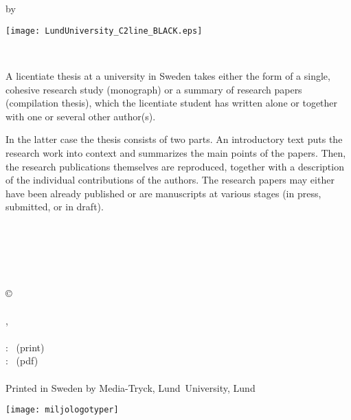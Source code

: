 \cleardoublepage
\thispagestyle{empty} %
~
\vfill
\begin{center}
{\HUGE \myMainTitle}
\\[2mm]
{\huge \mySubTitle}

\vfill
{by \myName}

\vfill
\texttt{[image: LundUniversity\_C2line\_BLACK.eps]}

\\
\end{center}
\vfill


\newpage 
\thispagestyle{empty} %
\vspace{-15mm}
A licentiate thesis at a university in Sweden takes either the form of a single,
cohesive research study (monograph) or a summary of research papers
(compilation thesis), which the licentiate student has written alone or together
with one or several other author(s). 

In the latter case the thesis consists of two parts. An introductory text puts
the research work into context and summarizes the main points of the papers.
Then, the research publications themselves are reproduced, together
with a description of the individual contributions of the authors. The
research papers may either have been already published or are manuscripts at
various stages (in press, submitted, or in draft). 

\vfill
{\small
\myCoverFront\\
\\
\myCoverBack\\
\\
\myFundingInformation


\vspace{5mm}
\copyright\, \myName~\myYear\\
\\
\myFaculty, {\myDepartment}
\\
\\
\ISBN: \myISBNprint~(print)\\ %
\ISBN: \myISBNpdf~(pdf)\\ %
\\
Printed in Sweden by Media-Tryck, Lund~University, Lund~\myYear

\texttt{[image: miljologotyper]}
}
